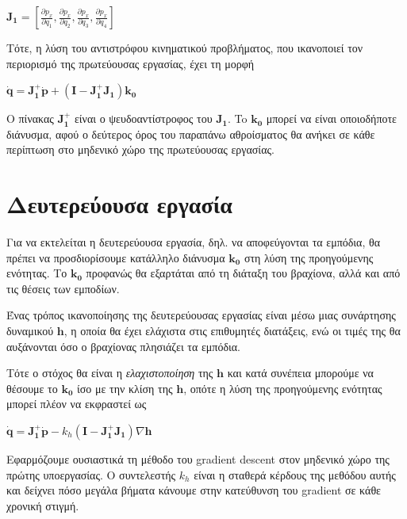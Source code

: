 \documentclass[a4paper, 11pt, english, greek]{article}
\begin{document}
\begin{center}
	$\mathbf{J_{1}} = [\frac{\displaystyle \partial p_{x}}{\displaystyle \partial q_{1}},
	                   \frac{\displaystyle \partial p_{x}}{\displaystyle \partial q_{2}},
	                   \frac{\displaystyle \partial p_{x}}{\displaystyle \partial q_{3}},
	                   \frac{\displaystyle \partial p_{x}}{\displaystyle \partial q_{4}}]$
\end{center}
Τότε, η λύση του αντιστρόφου κινηματικού προβλήματος, που ικανοποιεί τον περιορισμό της πρωτεύουσας εργασίας,
έχει τη μορφή

\begin{center}
	$\mathbf{\dot{q}} = \mathbf{J_{1}^{+}} \mathbf{\dot{p}} +
	         (\mathbf{I} - \mathbf{J_{1}^{+}} \mathbf{J_{1}}) \mathbf{k_{0}}$
\end{center}
Ο πίνακας $\mathbf{J_{1}^{+}}$ είναι ο ψευδοαντίστροφος του $\mathbf{J_{1}}$.
To $\mathbf{k_{0}}$ μπορεί να είναι οποιοδήποτε διάνυσμα, αφού ο δεύτερος όρος του παραπάνω αθροίσματος θα ανήκει
σε κάθε περίπτωση στο μηδενικό χώρο της πρωτεύουσας εργασίας.

\section{Δευτερεύουσα εργασία}
Για να εκτελείται η δευτερεύουσα εργασία, δηλ. να αποφεύγονται τα εμπόδια, θα πρέπει να προσδιορίσουμε κατάλληλο διάνυσμα
$\mathbf{k_{0}}$ στη λύση της προηγούμενης ενότητας.
Το $\mathbf{k_{0}}$ προφανώς θα εξαρτάται από τη διάταξη του βραχίονα, αλλά και από τις θέσεις των εμποδίων.

Ένας τρόπος ικανοποίησης της δευτερεύουσας εργασίας είναι μέσω μιας συνάρτησης δυναμικού $\mathbf{h}$, η οποία θα έχει
ελάχιστα στις επιθυμητές διατάξεις, ενώ οι τιμές της θα αυξάνονται όσο ο βραχίονας πλησιάζει τα εμπόδια.

Τότε ο στόχος θα είναι η \emph{ελαχιστοποίηση} της $\mathbf{h}$ και κατά συνέπεια μπορούμε να θέσουμε το $\mathbf{k_{0}}$
ίσο με την κλίση της $\mathbf{h}$, οπότε η λύση της προηγούμενης ενότητας μπορεί πλέον να εκφραστεί ως

\begin{center}
	$\mathbf{\dot{q}} = \mathbf{J_{1}^{+}} \mathbf{\dot{p}} -
	         k_{h} (\mathbf{I} - \mathbf{J_{1}^{+}} \mathbf{J_{1}}) \nabla\mathbf{h}$
\end{center}
Εφαρμόζουμε ουσιαστικά τη μέθοδο του \textlatin{gradient descent} στον μηδενικό χώρο της πρώτης υποεργασίας.
Ο συντελεστής $k_{h}$ είναι η σταθερά κέρδους της μεθόδου αυτής και δείχνει πόσο μεγάλα βήματα κάνουμε στην κατεύθυνση
του \textlatin{gradient} σε κάθε χρονική στιγμή.
\end{document}
